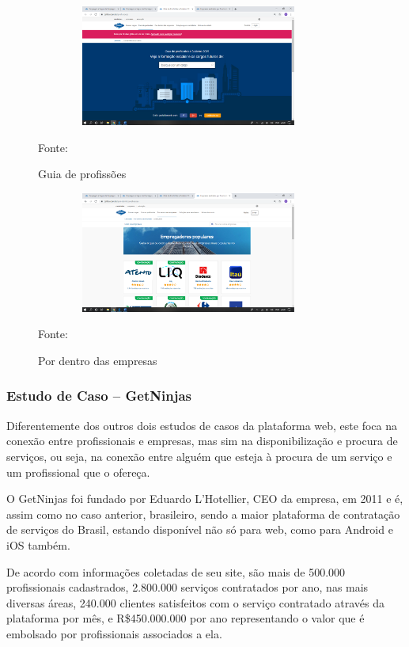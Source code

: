 \begin{figure}[!h]
	\centering
	\caption{Guia de profissões}
	\includegraphics[width=380px, height=150px]{./images/cattho2.png}
	\par {Fonte: \cite{catho-2}}
\end{figure}

\begin{figure}[!h]
	\centering
	\caption{Por dentro das empresas}
	\includegraphics[width=380px, height=150px]{./images/cattho3.png}
	\par {Fonte: \cite{catho-3}}
\end{figure}
\newpage 
\subsubsection{Estudo de Caso – GetNinjas}

Diferentemente dos outros dois estudos de casos da plataforma web, este foca na conexão entre profissionais e empresas, mas sim na disponibilização e procura de serviços, ou seja, na conexão entre alguém que esteja à procura de um serviço e um profissional que o ofereça.

O GetNinjas foi fundado por Eduardo L’Hotellier, CEO da empresa, em 2011 e é, assim como no caso anterior, brasileiro, sendo a maior plataforma de contratação de serviços do Brasil, estando disponível não só para web, como para Android e iOS também.

De acordo com informações coletadas de seu site, são mais de 500.000 profissionais cadastrados, 2.800.000 serviços contratados por ano, nas mais diversas áreas, 240.000 clientes satisfeitos com o serviço contratado através da plataforma por mês, e R\$450.000.000 por ano representando o valor que é embolsado por profissionais associados a ela.

